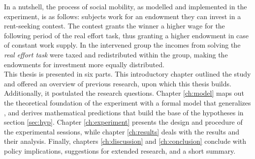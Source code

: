 In a nutshell, the process of social mobility, as modelled and implemented in the experiment, is as follows: subjects work for an endowment they can invest in a rent-seeking contest. The contest grants the winner a higher wage for the following period of the real effort task, thus granting a higher endowment in case of constant work supply. In the intervened group the incomes from solving the \textit{real effort task} were taxed and redistributed within the group, making the endowments for investment more equally distributed.\\

This thesis is presented in six parts. This introductory chapter outlined the study and offered an overview of previous research, upon which this thesis builds. Additionally, it postulated the research questions. Chapter \ref{ch:model} maps out the theoretical foundation of the experiment with a formal model that generalizes \cite{koch2017}, and derives mathematical predictions that build the base of the hypotheses in section \ref{sec:hyp}. Chapter \ref{ch:experiment} presents the design and procedure of the experimental sessions, while chapter \ref{ch:results} deals with the results and their analysis. Finally, chapters \ref{ch:discussion} and \ref{ch:conclusion} conclude with policy implications, suggestions for extended research, and a short summary.